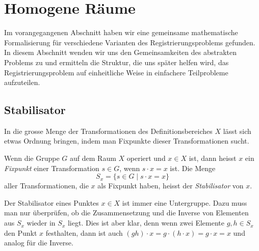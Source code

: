 %
%
%
\section{Homogene Räume
\label{buch:nichtkomm:section:homogeneraeume}}
Im vorangegangenen Abschnitt haben wir eine gemeinsame mathematische
Formalisierung für verschiedene Varianten des Registrierungsproblems
gefunden.
In diesem Abschnitt wenden wir uns den Gemeinsamkeiten des 
abstrakten Problems zu und ermitteln die Struktur, die uns später
helfen wird, das Registrierungsproblem auf einheitliche Weise
in einfachere Teilprobleme aufzuteilen.

%
%
\subsection{Stabilisator
\label{buch:nichtkomm:homogen:subsection:stabilisator}}
In die grosse Menge der Transformationen des Definitionsbereiches
$X$ lässt sich etwas Ordnung bringen, indem man Fixpunkte dieser
Transformationen sucht.

\begin{definition}
Wenn die Gruppe $G$ auf dem Raum $X$ operiert und $x\in X$ ist, dann
heisst $x$ ein {\em Fixpunkt} einer Transformation $s\in G$, wenn 
%
$s\cdot x = x$ ist.
Die Menge
\[
S_x = \{ s\in G \mid s\cdot x = x \}
\]
aller Transformationen, die $x$ als Fixpunkt haben,
heisst der {\em Stabilisator} von $x$.
%
\end{definition}

Der Stabilisator eines Punktes $x\in X$ ist immer eine Untergruppe.
Dazu muss man nur überprüfen, ob die Zusammensetzung und die Inverse
von Elementen aus $S_x$ wieder in $S_x$ liegt.
Dies ist aber klar, denn wenn zwei Elemente $g,h\in S_x$ den Punkt $x$
festhalten, dann ist auch $(gh)\cdot x= g\cdot(h\cdot x) = g\cdot x = x$
und analog für die Inverse.

